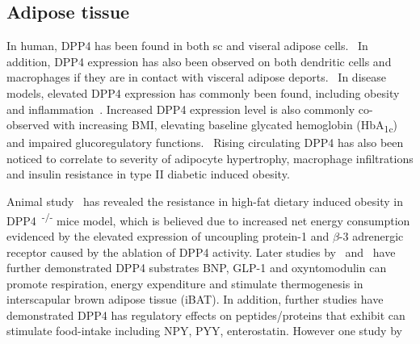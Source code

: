 \subsection{Adipose tissue}
In human, DPP4 has been found in both sc and viseral adipose cells.~\cite{Lamers2011} In addition, DPP4 expression has also been observed on both dendritic cells and macrophages if they are in contact with visceral adipose deports.~\cite{Zhong2013} In disease models, elevated DPP4 expression has commonly been found, including obesity and inflammation~\cite{Zhong2013}. Increased DPP4 expression level is also commonly co-observed with increasing BMI, elevating baseline glycated hemoglobin (HbA\textsubscript{1c})~\cite{2011} and impaired glucoregulatory functions.~\cite{Zhong2013,Sell2013} Rising circulating DPP4 has also been noticed to correlate to severity of adipocyte hypertrophy, macrophage infiltrations and insulin resistance in type II diabetic induced obesity.~\cite{Sell2013}  
\par 
Animal study~\cite{Conarello2003} has revealed the resistance in high-fat dietary induced obesity in DPP4~\textsuperscript{-/-} mice model, which is believed due to increased net energy consumption evidenced by the elevated expression of uncoupling protein-1 and $\beta$-3 adrenergic receptor caused by the ablation of DPP4 activity. Later studies by~\citet{Bordicchia2012} and~\citet{Lockie2012} have further demonstrated DPP4 substrates BNP, GLP-1 and oxyntomodulin can promote respiration, energy expenditure and stimulate thermogenesis in interscapular brown adipose tissue (iBAT). In addition, further studies have demonstrated DPP4 has regulatory effects on peptides/proteins that exhibit can stimulate food-intake including NPY, PYY, enterostatin. However one study by~\citet{Drucker2006} 